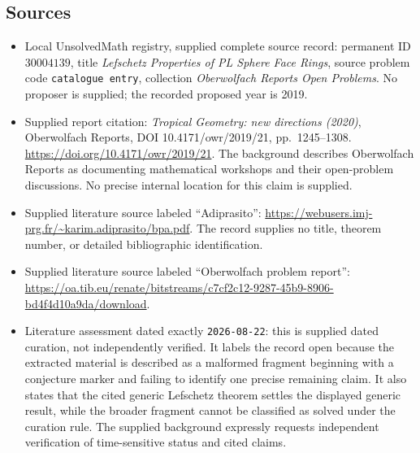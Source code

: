 \documentclass[11pt]{article}
\begin{document}
\subsection{Sources}
\begin{itemize}
\item Local UnsolvedMath registry, supplied complete source record: permanent ID \(30004139\), title \emph{Lefschetz Properties of PL Sphere Face Rings}, source problem code \texttt{catalogue entry}, collection \emph{Oberwolfach Reports Open Problems}. No proposer is supplied; the recorded proposed year is 2019.
\item Supplied report citation: \emph{Tropical Geometry: new directions (2020)}, Oberwolfach Reports, DOI 10.4171/owr/2019/21, pp.\ 1245--1308. \url{https://doi.org/10.4171/owr/2019/21}. The background describes Oberwolfach Reports as documenting mathematical workshops and their open-problem discussions. No precise internal location for this claim is supplied.
\item Supplied literature source labeled ``Adiprasito'': \url{https://webusers.imj-prg.fr/~karim.adiprasito/bpa.pdf}. The record supplies no title, theorem number, or detailed bibliographic identification.
\item Supplied literature source labeled ``Oberwolfach problem report'': \url{https://oa.tib.eu/renate/bitstreams/c7cf2c12-9287-45b9-8906-bd4f4d10a9da/download}.
\item Literature assessment dated exactly \texttt{2026-08-22}: this is supplied dated curation, not independently verified. It labels the record open because the extracted material is described as a malformed fragment beginning with a conjecture marker and failing to identify one precise remaining claim. It also states that the cited generic Lefschetz theorem settles the displayed generic result, while the broader fragment cannot be classified as solved under the curation rule. The supplied background expressly requests independent verification of time-sensitive status and cited claims.
\end{itemize}
\end{document}
